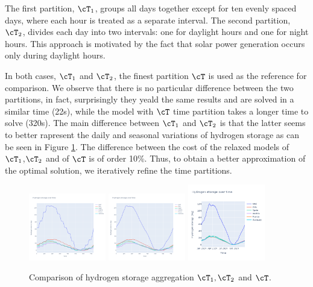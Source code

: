 \documentclass[english]{article}
\numberwithin{definition}{section}
\numberwithin{theorem}{section}
\numberwithin{problem}{section}
\begin{document}
The first partition, \(\cT_1\), groups all days together except for ten evenly spaced days, where each hour is treated as a separate interval. The second partition, \(\cT_2\), divides each day into two intervals: one for daylight hours and one for night hours. This approach is motivated by the fact that solar power generation occurs only during daylight hours.

In both cases, \(\cT_1\) and \(\cT_2\), the finest partition \(\cT\) is used as the reference for comparison.
We observe that there is no particular difference between the two partitions, in fact, surprisingly they yeald the same results and are solved in a similar time (22s), while the model with \(\cT\) time partition takes a longer time to solve (320s).
The main difference between \(\cT_1\) and \(\cT_2\) is that the latter seems to better rapresent the daily and seasonal variations of hydrogen storage as can be seen in Figure \ref{fig:aggHydrogen}. The difference between the cost of the relaxed models of \(\cT_1\),\(\cT_2\) and of \(\cT\) is of order 10\%.
Thus, to obtain a better approximation of the optimal solution, we iteratively refine the time partitions.

\begin{figure}[H]
  \centering
  \includegraphics[width=0.30\textwidth]{immagini/time_aggregation/agg2hydrogen.png}
  \includegraphics[width=0.30\textwidth]{immagini/time_aggregation/agg1hydrogen.png}
  \includegraphics[width=0.30\textwidth]{immagini/time_aggregation/finesthydrongen.png}
  \caption{Comparison of hydrogen storage aggregation \(\cT_1,\cT_2\) and \(\cT\).}
  \label{fig:aggHydrogen}
\end{figure}
\end{document}
